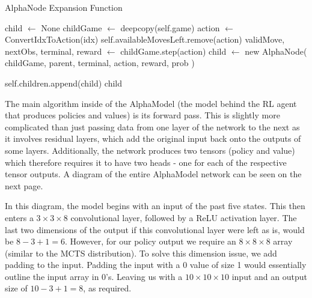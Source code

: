 \documentclass{article}
\makeatletter
\newcommand\subsubsubsection{\@startsection{paragraph}{4}{\z@}{-2.5ex\@plus -1ex \@minus -.25ex}{1.25ex \@plus .25ex}{\normalfont\normalsize\bfseries}}
\makeatother
\begin{document}
    \begin{algorithm} 
        \caption{AlphaNode Expansion Function}
        \begin{algorithmic}
            \State child $\gets$ None
                    \State childGame $\gets$ deepcopy(self.game)
                    \State action $\gets$ ConvertIdxToAction(idx)
                    \State self.availableMovesLeft.remove(action)
                    \State validMove, nextObs, terminal, reward $\gets$ childGame.step(action)
                    \State child $\gets$ new AlphaNode(
                        childGame,
                        parent,
                        terminal,
                        action,
                        reward,
                        prob
                    )

                    self.children.append(child)
                \EndIf
            \EndFor
            \State \Return child
        \EndFunction
        \end{algorithmic}
    \end{algorithm}

    \subsubsubsection{Alpha Network}

    The main algorithm inside of the AlphaModel (the model behind the RL agent that produces policies and values) is its forward pass.
    This is slightly more complicated than just passing data from one layer of the network to the next as it involves residual layers, which
    add the original input back onto the outputs of some layers. Additionally, the network produces two tensors (policy and value) which
    therefore requires it to have two heads - one for each of the respective tensor outputs. A diagram of the entire AlphaModel network
    can be seen on the next page.

    In this diagram, the model begins with an input of the past five states. This then enters a $3\times3\times8$ convolutional layer, followed by a
    ReLU activation layer. The last two dimensions of the output if this convolutional layer were left as is, would be $8 - 3 + 1 = 6$. However, for our
    policy output we require an $8\times8\times8$ array (similar to the MCTS distribution). To solve this dimension issue, we add padding to the input.
    Padding the input with a 0 value of size 1 would essentially outline the input array in 0's. Leaving us with a $10\times10\times10$ input and an output
    size of $10 - 3 + 1 = 8$, as required.
\end{document}
